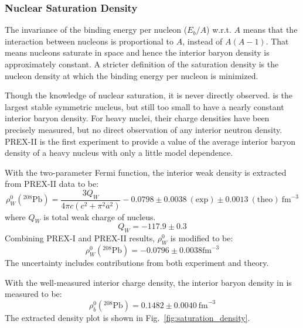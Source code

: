 \subsubsection{Nuclear Saturation Density}
The invariance of the binding energy per nucleon ($E_b/A$) w.r.t. $A$ means that
the interaction between nucleons is proportional to $A$, instead of $A(A-1)$. 
That means nucleons saturate in space and hence the interior baryon density is approximately constant. 
A stricter definition of the saturation density
is the nucleon density at which the binding energy per nucleon is minimized.

Though the knowledge of nuclear saturation, it is never directly observed.
\ca is the largest stable symmetric nucleus, but still too small to have a nearly 
constant interior baryon density. For heavy nuclei, their charge densities have
been precisely measured, but no direct observation of any interior neutron density. 
PREX-II is the first experiment to provide a value of the average interior baryon density of 
a heavy nucleus with only a little model dependence.

With the two-parameter Fermi function, the interior weak density is extracted 
from PREX-II data to be:
\begin{equation}
    \rho_W^0({}^{208}\text{Pb}) = \frac{3Q_W}{4\pi c (c^2 + \pi^2 a^2)} 
    -0.0798 \pm 0.0038 \ (\text{exp}) \pm 0.0013 \ (\text{theo})\ \mathrm{fm}^{-3}
\end{equation}
where $Q_W$ is total weak charge of \Pb nucleus.
\begin{equation}
    Q_W = -117.9 \pm 0.3
\end{equation}
Combining PREX-I and PREX-II results, $\rho_W^0$ is modified to be:
\begin{equation}
    \rho_W^0({}^{208}\text{Pb}) = -0.0796 \pm 0.0038 \mathrm{fm}^{-3}
\end{equation}
The uncertainty includes contributions from both experiment and theory.

With the well-measured interior charge density, the interior baryon density 
in \Pb is measured to be:
\begin{equation}
    \rho^0_b({}^{208}\text{Pb}) = 0.1482 \pm 0.0040\ \mathrm{fm}^{-3}
\end{equation}
The extracted density plot is shown in Fig.~\ref{fig:saturation_density}.


